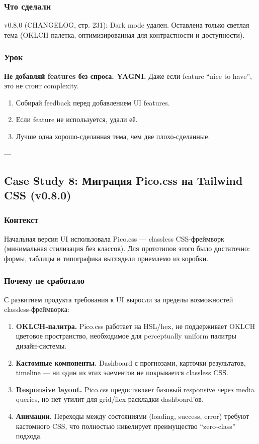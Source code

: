 \subsubsection*{Что сделали}
v0.8.0 (CHANGELOG, стр. 231): Dark mode удален. Оставлена только светлая тема (OKLCH палетка, оптимизированная для контрастности и доступности).

\subsubsection*{Урок}
\textbf{Не добавляй features без спроса. YAGNI.} Даже если feature ``nice to have'', это не стоит complexity.

\begin{enumerate}
\item Собирай feedback перед добавлением UI features.
\item Если feature не используется, удали её.
\item Лучше одна хорошо-сделанная тема, чем две плохо-сделанные.
\end{enumerate}

---

\subsection{Case Study 8: Миграция Pico.css на Tailwind CSS (v0.8.0)}

\subsubsection*{Контекст}
Начальная версия UI использовала Pico.css --- classless CSS-фреймворк (минимальная стилизация без классов). Для прототипов этого было достаточно: формы, таблицы и типографика выглядели приемлемо из коробки.

\subsubsection*{Почему не сработало}
С развитием продукта требования к UI выросли за пределы возможностей classless-фреймворка:
\begin{enumerate}
\item \textbf{OKLCH-палитра.} Pico.css работает на HSL/hex, не поддерживает OKLCH цветовое пространство, необходимое для perceptually uniform палитры дизайн-системы.
\item \textbf{Кастомные компоненты.} Dashboard с прогнозами, карточки результатов, timeline --- ни один из этих элементов не покрывается classless CSS.
\item \textbf{Responsive layout.} Pico.css предоставляет базовый responsive через media queries, но нет утилит для grid/flex раскладки dashboard'ов.
\item \textbf{Анимации.} Переходы между состояниями (loading, success, error) требуют кастомного CSS, что полностью нивелирует преимущество ``zero-class'' подхода.
\end{enumerate}

